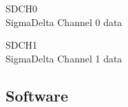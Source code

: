 \begin{description}
\item{SDCH0} \hfill \\ SigmaDelta Channel 0 data
\item{SDCH1} \hfill \\ SigmaDelta Channel 1 data
\end{description}



\subsection{Software}
